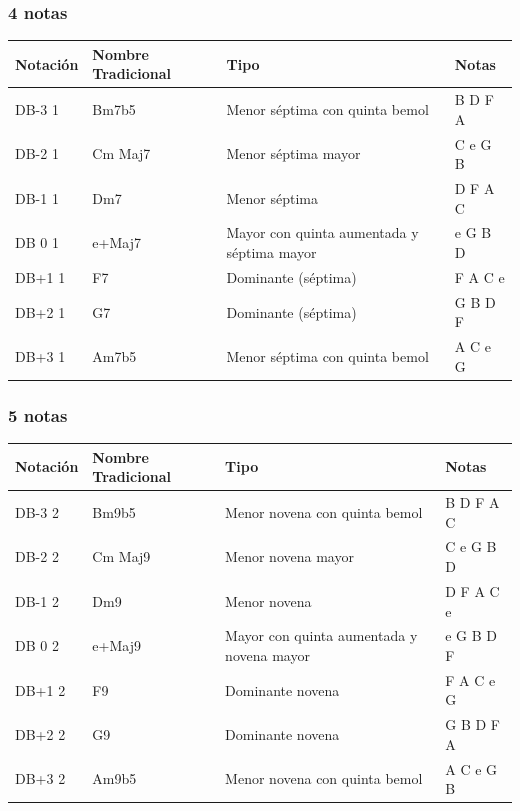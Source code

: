 \documentclass[]{report}
\begin{document}
\subsubsection*{4 notas}

\begin{table}[H]
	\centering
	\begin{tabularx}{\textwidth}{ll>{\raggedright\arraybackslash}Xl}
		\toprule
		Notación        & Nombre Tradicional & Tipo                                       & Notas   \\
		\midrule
		\textsf{DB-3} 1 & Bm7b5              & Menor séptima con quinta bemol             & B D F A \\
		\textsf{DB-2} 1 & Cm Maj7            & Menor séptima mayor                        & C e G B \\
		\textsf{DB-1} 1 & Dm7                & Menor séptima                              & D F A C \\
		\textsf{DB 0} 1 & e+Maj7             & Mayor con quinta aumentada y séptima mayor & e G B D \\
		\textsf{DB+1} 1 & F7                 & Dominante (séptima)                        & F A C e \\
		\textsf{DB+2} 1 & G7                 & Dominante (séptima)                        & G B D F \\
		\textsf{DB+3} 1 & Am7b5              & Menor séptima con quinta bemol             & A C e G \\
		\bottomrule
	\end{tabularx}
\end{table}

\subsubsection*{5 notas}

\begin{table}[H]
	\centering
	\begin{tabularx}{\textwidth}{ll>{\raggedright\arraybackslash}Xl}
		\toprule
		Notación        & Nombre Tradicional & Tipo                                      & Notas     \\
		\midrule
		\textsf{DB-3} 2 & Bm9b5              & Menor novena con quinta bemol             & B D F A C \\
		\textsf{DB-2} 2 & Cm Maj9            & Menor novena mayor                        & C e G B D \\
		\textsf{DB-1} 2 & Dm9                & Menor novena                              & D F A C e \\
		\textsf{DB 0} 2 & e+Maj9             & Mayor con quinta aumentada y novena mayor & e G B D F \\
		\textsf{DB+1} 2 & F9                 & Dominante novena                          & F A C e G \\
		\textsf{DB+2} 2 & G9                 & Dominante novena                          & G B D F A \\
		\textsf{DB+3} 2 & Am9b5              & Menor novena con quinta bemol             & A C e G B \\
		\bottomrule
	\end{tabularx}
\end{table}
\end{document}
